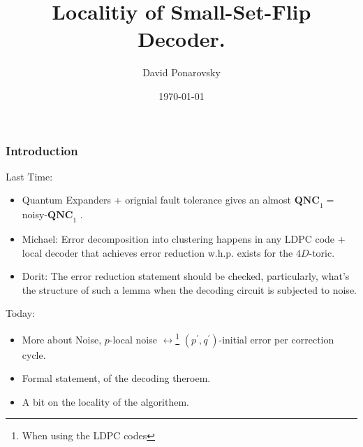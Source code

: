 \documentclass{beamer}
\newcommand*{\QNCon}{ \mathbf{QNC}_{1} }
\newcommand*{\noiseQNCon}{ noisy-$\QNCon$ }
\begin{document}
 

\newcommand*{\Tr}{\textbf{Tr }}


\begin{frame}
  \title{ Localitiy of Small-Set-Flip Decoder.  }
    \author{David Ponarovsky}
    \date{\today}
    \titlepage
\end{frame}


\begin{frame}

\frametitle{Introduction}

\begin{block}{Last Time:}
\begin{itemize}
  \item Quantum Expanders + orignial fault tolerance gives an almost  $\QNCon =$ \noiseQNCon. 
  \item Michael: Error decomposition into clustering happens in any LDPC code + local decoder that achieves error reduction w.h.p. exists for the $4D$-toric.
  \item Dorit: The error reduction statement should be checked, particularly, what's the structure of such a lemma when the decoding circuit is subjected to noise.

\end{itemize}
\end{block}


\begin{block}{Today:}
\begin{itemize}
  \item More about Noise, $p$-local noise $\leftrightarrow$\footnote{When using the LDPC codes} $(p^\prime, q^\prime)$-initial error per correction cycle. 
  \item  Formal statement, of the decoding theroem. 
  \item A bit on the locality of the algorithem.  
\end{itemize}
\end{block}
\end{frame}
\end{document}
